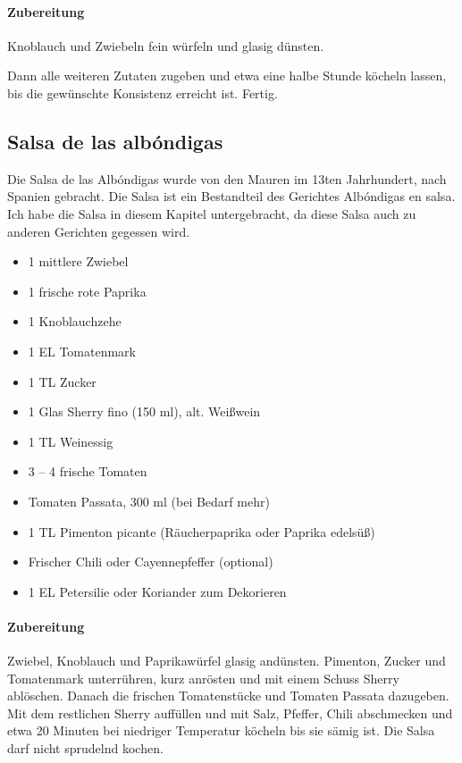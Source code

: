 \paragraph{Zubereitung}

Knoblauch und Zwiebeln fein würfeln und glasig dünsten.

Dann alle weiteren Zutaten zugeben und etwa eine halbe Stunde köcheln 
lassen, bis die gewünschte Konsistenz erreicht ist. Fertig.

\subsection{Salsa de las albóndigas}\label{SalsaAlbondigas}

Die Salsa de las Albóndigas wurde von den Mauren im 13ten Jahrhundert, nach Spanien gebracht. Die Salsa ist ein Bestandteil des 
Gerichtes Albóndigas en salsa. Ich habe die Salsa in diesem Kapitel untergebracht, da diese Salsa auch zu anderen Gerichten gegessen 
wird.

\begin{itemize}[noitemsep]
	\item 1 mittlere Zwiebel
	\item 1 frische rote Paprika
	\item 1 Knoblauchzehe
	\item 1 EL Tomatenmark
	\item 1 TL Zucker
	\item 1 Glas Sherry fino (150 ml), alt. Weißwein 
	\item 1 TL Weinessig
	\item 3 – 4 frische Tomaten
	\item Tomaten Passata, 300 ml (bei Bedarf mehr)
	\item 1 TL Pimenton picante (Räucherpaprika oder Paprika edelsüß)
	\item Frischer Chili oder Cayennepfeffer (optional)
	\item 1 EL Petersilie oder Koriander zum Dekorieren
\end{itemize}

\paragraph{Zubereitung}

Zwiebel, Knoblauch und Paprikawürfel glasig andünsten. Pimenton, Zucker und Tomatenmark unterrühren, kurz anrösten und mit einem 
Schuss Sherry ablöschen. Danach die frischen Tomatenstücke und Tomaten Passata dazugeben. Mit dem restlichen Sherry auffüllen und 
mit Salz, Pfeffer, Chili abschmecken und etwa 20 Minuten bei niedriger Temperatur köcheln bis sie sämig ist. Die Salsa darf nicht 
sprudelnd kochen.

